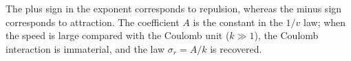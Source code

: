 The plus sign in the exponent corresponds to repulsion, whereas the minus sign corresponds to attraction. The coefficient $A$ is the constant in the $1/v$ law; when the speed is large compared with the Coulomb unit ($k\gg1$), the Coulomb interaction is immaterial, and the law $\sigma_r=A/k$ is recovered.
